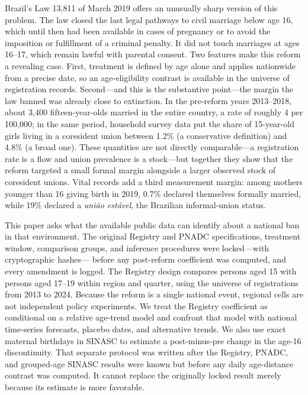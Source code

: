 \documentclass[12pt]{article}
\begin{document}
Brazil's Law 13,811 of March 2019 offers an unusually sharp version of this problem. The
law closed the last legal pathways to civil marriage below age 16, which until then had
been available in cases of pregnancy or to avoid the imposition or fulfillment of a
criminal penalty. It did not touch
marriages at ages 16--17, which remain lawful with parental consent. Two features make
this reform a revealing case. First, treatment is defined by age alone and applies
nationwide from a precise date, so an age-eligibility contrast is available in the
universe of registration records. Second---and this is the substantive point---the margin
the law banned was already close to extinction. In the pre-reform years 2013--2018, about
3,400 fifteen-year-olds married in the entire country, a rate of roughly 4 per 100,000;
in the same period, household survey data put the share of 15-year-old girls living in a
coresident union between 1.2\% (a conservative definition) and 4.8\% (a broad one).
These quantities are not directly comparable---a registration rate is a flow and union
prevalence is a stock---but together they show that the reform targeted a small formal
margin alongside a larger observed stock of coresident unions. Vital records add a third
measurement margin: among mothers younger than 16
giving birth in 2019, 0.7\% declared themselves formally married, while 19\% declared a
\emph{uni\~ao est\'avel}, the Brazilian informal-union status.

This paper asks what the available public data can identify about a national ban in that
environment. The original Registry and PNADC specifications, treatment window,
comparison groups, and inference procedures were locked---with cryptographic hashes---
before any post-reform coefficient was computed, and every amendment is logged. The
Registry design compares persons aged 15 with persons aged 17--19 within region and
quarter, using the universe of registrations from 2013 to 2024. Because the reform is a
single national event, regional cells are not independent policy experiments. We treat
the Registry coefficient as conditional on a relative age-trend model and confront that
model with national time-series forecasts, placebo dates, and alternative trends. We
also use exact maternal birthdays in SINASC to estimate a post-minus-pre change in the
age-16 discontinuity. That separate protocol was written after the Registry, PNADC, and
grouped-age SINASC results were known but before any daily age-distance contrast was
computed. It cannot replace the originally locked result merely because its estimate is
more favorable.
\end{document}
